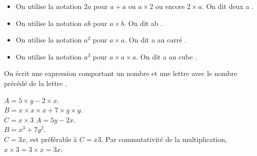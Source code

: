 \begin{propriete}
   \begin{itemize}
      \item On utilise la notation $2a$ pour $a+a$ ou $a\times2$ ou encore $2\times a$. On dit \og deux a \fg.
      \item On utilise la notation $ab$ pour $a\times b$. On dit \og ab \fg.
      \item On utilise la notation $a^2$ pour $a\times a$. On dit \og a au carré \fg.
      \item On utilise la notation $a^3$ pour $a\times a\times a$. On dit \og a au cube \fg. \\ [-8mm]
   \end{itemize}
\end{propriete}

\bigskip

On écrit une expression comportant un nombre et une \og lettre \fg{} avec le nombre précédé de la \og lettre \fg.

\begin{exemple}[0.5]
   $A =5\times y-2\times x$. \\
   $B =x\times x \times x + 7\times y\times y$. \\
   $C =x\times3$
   \correction
      $A =5y-2x$. \\
      $B =x^3+7y^2$. \\
      $C =3x$, est préférable à $C=x3$. Par commutativité de la multiplication, $x\times3 =3\times x =3x$.
\end{exemple}


\exercicesbase

